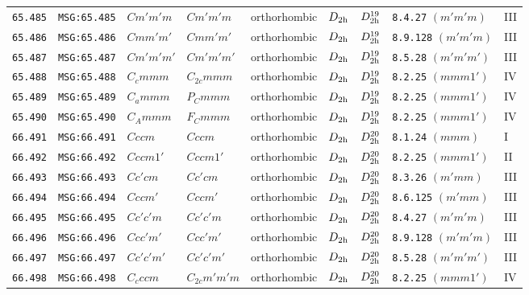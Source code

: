 \documentclass[fleqn,10pt]{jsarticle}
\begin{document}
\begin{center}
\begin{longtable}{lllllllll}
\texttt{65.485} & \texttt{MSG:65.485} & $Cm'm'm$ & $Cm'm'm$ & orthorhombic & $D_{\rm 2h}$ & $D_{\rm 2h}^{19}$ & \texttt{8.4.27} $(m'm'm)$ & III \\
\texttt{65.486} & \texttt{MSG:65.486} & $Cmm'm'$ & $Cmm'm'$ & orthorhombic & $D_{\rm 2h}$ & $D_{\rm 2h}^{19}$ & \texttt{8.9.128} $(m'm'm)$ & III \\
\texttt{65.487} & \texttt{MSG:65.487} & $Cm'm'm'$ & $Cm'm'm'$ & orthorhombic & $D_{\rm 2h}$ & $D_{\rm 2h}^{19}$ & \texttt{8.5.28} $(m'm'm')$ & III \\
\texttt{65.488} & \texttt{MSG:65.488} & $C_{c}mmm$ & $C_{2c}mmm$ & orthorhombic & $D_{\rm 2h}$ & $D_{\rm 2h}^{19}$ & \texttt{8.2.25} $(mmm1')$ & IV \\
\texttt{65.489} & \texttt{MSG:65.489} & $C_{a}mmm$ & $P_{C}mmm$ & orthorhombic & $D_{\rm 2h}$ & $D_{\rm 2h}^{19}$ & \texttt{8.2.25} $(mmm1')$ & IV \\
\texttt{65.490} & \texttt{MSG:65.490} & $C_{A}mmm$ & $F_{C}mmm$ & orthorhombic & $D_{\rm 2h}$ & $D_{\rm 2h}^{19}$ & \texttt{8.2.25} $(mmm1')$ & IV \\ \hline
\texttt{66.491} & \texttt{MSG:66.491} & $Cccm$ & $Cccm$ & orthorhombic & $D_{\rm 2h}$ & $D_{\rm 2h}^{20}$ & \texttt{8.1.24} $(mmm)$ & I \\
\texttt{66.492} & \texttt{MSG:66.492} & $Cccm1'$ & $Cccm1'$ & orthorhombic & $D_{\rm 2h}$ & $D_{\rm 2h}^{20}$ & \texttt{8.2.25} $(mmm1')$ & II \\
\texttt{66.493} & \texttt{MSG:66.493} & $Cc'cm$ & $Cc'cm$ & orthorhombic & $D_{\rm 2h}$ & $D_{\rm 2h}^{20}$ & \texttt{8.3.26} $(m'mm)$ & III \\
\texttt{66.494} & \texttt{MSG:66.494} & $Cccm'$ & $Cccm'$ & orthorhombic & $D_{\rm 2h}$ & $D_{\rm 2h}^{20}$ & \texttt{8.6.125} $(m'mm)$ & III \\
\texttt{66.495} & \texttt{MSG:66.495} & $Cc'c'm$ & $Cc'c'm$ & orthorhombic & $D_{\rm 2h}$ & $D_{\rm 2h}^{20}$ & \texttt{8.4.27} $(m'm'm)$ & III \\
\texttt{66.496} & \texttt{MSG:66.496} & $Ccc'm'$ & $Ccc'm'$ & orthorhombic & $D_{\rm 2h}$ & $D_{\rm 2h}^{20}$ & \texttt{8.9.128} $(m'm'm)$ & III \\
\texttt{66.497} & \texttt{MSG:66.497} & $Cc'c'm'$ & $Cc'c'm'$ & orthorhombic & $D_{\rm 2h}$ & $D_{\rm 2h}^{20}$ & \texttt{8.5.28} $(m'm'm')$ & III \\
\texttt{66.498} & \texttt{MSG:66.498} & $C_{c}ccm$ & $C_{2c}m'm'm$ & orthorhombic & $D_{\rm 2h}$ & $D_{\rm 2h}^{20}$ & \texttt{8.2.25} $(mmm1')$ & IV \\

\end{longtable}
\end{center}
\end{document}
